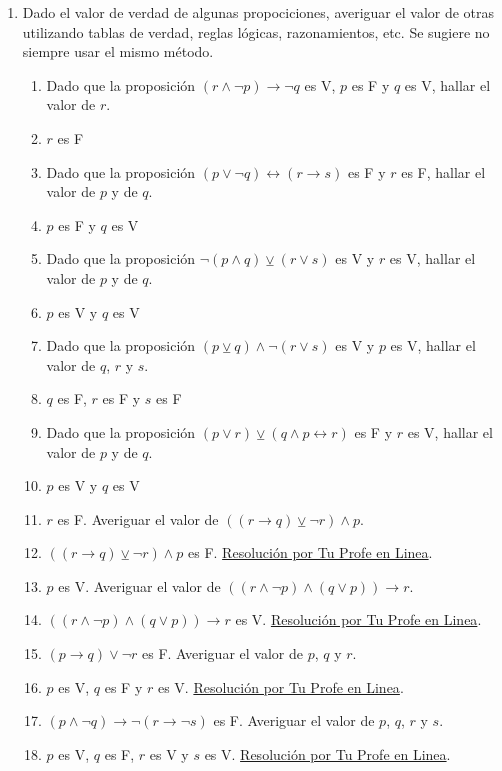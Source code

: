 \documentclass[a4paper]{article}
\newcommand{\answer}{\item[**]}
\newcommand{\exercise}{\item}
\newcommand{\then}{\to}
\newcommand{\eq}{\leftrightarrow}
\newcommand{\xor}{\veebar}
\begin{document}
\begin{enumerate}[resume]
\begin{multicols}{3}
\begin{enumerate} [label=(\alph*)]
	\end{enumerate}
  \end{multicols}

	\exercise Dado el valor de verdad de algunas propociciones, averiguar el valor de otras utilizando tablas de verdad, reglas lógicas, razonamientos, etc. Se sugiere no siempre usar el mismo método.
	\begin{enumerate} [label=(\alph*)]

		\item Dado que la proposición $(r\land \neg p)\then \neg q$ es V, $p$ es F y $q$ es V, hallar el valor de $r$. 
		\answer $r$ es F 

		\item Dado que la proposición $(p\lor \neg q) \eq  (r\then s)$ es F  y $r$ es F, hallar el valor de $p$ y de $q$. 
		\answer $p$ es F y $q$ es V

		\item Dado que la proposición $\neg (p\land q) \xor  (r\lor s)$ es V  y $r$ es V, hallar el valor de $p$ y de $q$. 
		\answer $p$ es V y $q$ es V

		\item Dado que la proposición $(p\xor q) \land  \neg (r\lor s)$ es V  y $p$ es V, hallar el valor de $q$, $r$ y $s$. 
		\answer $q$ es F, $r$ es F y $s$ es F

		\item Dado que la proposición $(p\lor r) \xor  (q\land p \eq r)$ es F  y $r$ es V, hallar el valor de $p$ y de $q$. 
		\answer $p$ es V y $q$ es V

		\item $r$ es F. Averiguar el valor de $((r \then q) \xor \neg r) \land p$.
		\answer $((r \then q) \xor \neg r) \land p$ es F. \href{https://youtu.be/bitBrw1NvNk?t=663}{Resolución por Tu Profe en Linea}.

		\item $p$ es V. Averiguar el valor de $((r \land \neg p) \land (q \lor p)) \then r$.
		\answer $((r \land \neg p) \land (q \lor p)) \then r$ es V. \href{https://youtu.be/bitBrw1NvNk?t=793}{Resolución por Tu Profe en Linea}.

		\item $(p \then q) \lor \neg r$ es F. Averiguar el valor de $p$, $q$ y $r$.
		\answer $p$ es V, $q$ es F y $r$ es V. \href{https://youtu.be/bitBrw1NvNk}{Resolución por Tu Profe en Linea}.

		\item $(p \land \neg q) \then \neg (r \then \neg s)$ es F. Averiguar el valor de $p$, $q$, $r$ y $s$.
		\answer $p$ es V, $q$ es F, $r$ es V y $s$ es V. \href{https://youtu.be/bitBrw1NvNk?t=140}{Resolución por Tu Profe en Linea}.


\end{enumerate}
\end{enumerate}
\end{document}
